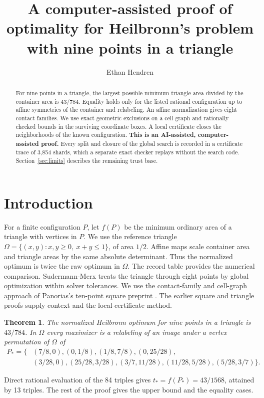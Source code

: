 \documentclass[11pt]{amsart}
\newtheorem{theorem}{Theorem}[section]
\newcommand{\Om}{\Omega}
\begin{document}
\title[Heilbronn's problem for nine points in a triangle]{A computer-assisted proof of optimality for Heilbronn's problem with nine points in a triangle}
\author{Ethan Hendren}
\begin{abstract}
For nine points in a triangle, the largest possible minimum triangle area divided by the container area is \(43/784\). Equality holds only for the listed rational configuration up to affine symmetries of the container and relabeling. An affine normalization gives eight contact families. We use exact geometric exclusions on a cell graph and rationally checked bounds in the surviving coordinate boxes. A local certificate closes the neighborhoods of the known configuration. \textbf{This is an AI-assisted, computer-assisted proof.} Every split and closure of the global search is recorded in a certificate trace of 3,854 shards, which a separate exact checker replays without the search code. Section~\ref{sec:limits} describes the remaining trust base.
\end{abstract}
\maketitle

\section{Introduction}
For a finite configuration \(P\), let \(f(P)\) be the minimum ordinary area of a triangle with vertices in \(P\). We use the reference triangle
\(\Om=\{(x,y):x,y\ge0,\ x+y\le1\}\), of area \(1/2\).
Affine maps scale container area and triangle areas by the same absolute determinant. Thus the normalized optimum is twice the raw optimum in \(\Om\).
The record table \cite{Stead} provides the numerical comparison. Sudermann-Merx \cite{SM} treats the triangle through eight points by global optimization within solver tolerances. We use the contact-family and cell-graph approach of Panorias's ten-point square preprint \cite{Panorias}. The earlier square and triangle proofs \cite{Square,Tri8} supply context and the local-certificate method.

\begin{theorem}\label{thm:main}
The normalized Heilbronn optimum for nine points in a triangle is \(43/784\). In \(\Om\) every maximizer is a relabeling of an image under a vertex permutation of \(\Om\) of
\[
\begin{split}
P_*=\{&(7/8,0),(0,1/8),(1/8,7/8),(0,25/28),\\
      &(3/28,0),(25/28,3/28),(3/7,11/28),(11/28,5/28),(5/28,3/7)\}.
\end{split}
\]
\end{theorem}
Direct rational evaluation of the 84 triples gives \(t_*=f(P_*)=43/1568\), attained by 13 triples. The rest of the proof gives the upper bound and the equality cases.
\end{document}
